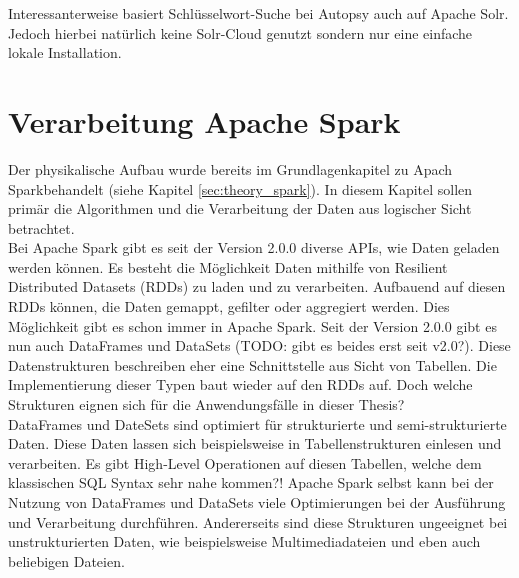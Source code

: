 \noindent
Interessanterweise basiert Schlüsselwort-Suche bei Autopsy auch auf Apache Solr. Jedoch hierbei natürlich keine Solr-Cloud genutzt sondern nur eine einfache lokale Installation.

\section{Verarbeitung Apache Spark}
Der physikalische Aufbau wurde bereits im Grundlagenkapitel zu Apach Spark\texttrademark behandelt (siehe Kapitel \ref{sec:theory_spark}). In diesem Kapitel sollen primär die Algorithmen und die Verarbeitung der Daten aus logischer Sicht betrachtet.\\ 

\noindent
Bei Apache Spark gibt es seit der Version 2.0.0 diverse APIs, wie Daten geladen werden können. Es besteht die Möglichkeit Daten mithilfe von Resilient Distributed Datasets (RDDs) zu laden und zu verarbeiten. Aufbauend auf diesen RDDs können, die Daten gemappt, gefilter oder aggregiert werden. Dies Möglichkeit gibt es schon immer in Apache Spark. Seit der Version 2.0.0 gibt es nun auch DataFrames und DataSets (TODO: gibt es beides erst seit v2.0?). Diese Datenstrukturen beschreiben eher eine Schnittstelle aus Sicht von Tabellen. Die Implementierung dieser Typen baut wieder auf den RDDs auf. Doch welche Strukturen eignen sich für die Anwendungsfälle in dieser Thesis? \\

\noindent
DataFrames und DateSets sind optimiert für strukturierte und semi-strukturierte Daten. Diese Daten lassen sich beispielsweise in Tabellenstrukturen einlesen und verarbeiten. Es gibt High-Level Operationen auf diesen Tabellen, welche dem klassischen SQL Syntax sehr nahe kommen?! Apache Spark selbst kann bei der Nutzung von DataFrames und DataSets viele Optimierungen bei der Ausführung und Verarbeitung durchführen. Andererseits sind diese Strukturen ungeeignet bei unstrukturierten Daten, wie beispielsweise Multimediadateien und eben auch beliebigen Dateien.\cite[S. 66 ff.]{data_processing_spark2}\\

